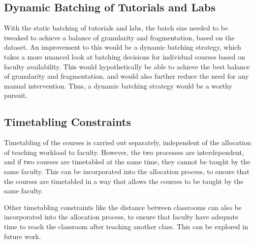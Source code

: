 \subsection{Dynamic Batching of Tutorials and Labs}

With the static batching of tutorials and labs, the batch size needed to be tweaked to achieve a balance of granularity and fragmentation, based on the dataset. An improvement to this would be a dynamic batching strategy, which takes a more nuanced look at batching decisions for individual courses based on faculty availability. This would hypothetically be able to achieve the best balance of granularity and fragmentation, and would also further reduce the need for any manual intervention. Thus, a dynamic batching strategy would be a worthy pursuit.

\subsection{Timetabling Constraints}

Timetabling of the courses is carried out separately, independent of the allocation of teaching workload to faculty. However, the two processes are interdependent, and if two courses are timetabled at the same time, they cannot be taught by the same faculty. This can be incorporated into the allocation process, to ensure that the courses are timetabled in a way that allows the courses to be taught by the same faculty.

Other timetabling constraints like the distance between classrooms can also be incorporated into the allocation process, to ensure that faculty have adequate time to reach the classroom after teaching another class. This can be explored in future work.

